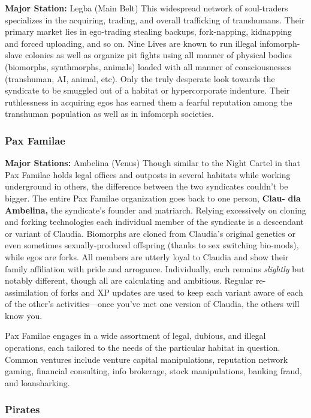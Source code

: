 \textbf{Major Station:} Legba (Main Belt)
This widespread network of soul-traders specializes 
in the acquiring, trading, and overall trafficking of 
transhumans. Their primary market lies in ego-trading
stealing backups, fork-napping, kidnapping and
forced uploading, and so on. Nine Lives are known 
to run illegal infomorph-slave colonies as well as 
organize pit fights using all manner of physical 
bodies (biomorphs, synthmorphs, animals) loaded 
with all manner of consciousnesses (transhuman, 
AI, animal, etc). Only the truly desperate look towards
the syndicate to be smuggled out of a habitat
or hypercorporate indenture. Their ruthlessness in 
acquiring egos has earned them a fearful reputation 
among the transhuman population as well as in 
infomorph societies.

\subsubsection{Pax Familae}

\textbf{Major Stations: }Ambelina (Venus)
Though similar to the Night Cartel in that Pax Familae 
holds legal offices and outposts in several habitats while 
working underground in others, the difference between 
the two syndicates couldn't be bigger. The entire Pax 
Familae organization goes back to one person, \textbf{Clau-}
\textbf{dia Ambelina,} the syndicate's founder and matriarch. 
Relying excessively on cloning and forking technologies
each individual member of the syndicate is a descendant
or variant of Claudia. Biomorphs are cloned
from Claudia's original genetics or even sometimes 
sexually-produced offspring (thanks to sex switching 
bio-mods), while egos are forks. All members are utterly
loyal to Claudia and show their family affiliation
with pride and arrogance. Individually, each remains 
\textit{slightly} but notably different, though all are calculating 
and ambitious. Regular re-assimilation of forks and XP 
updates are used to keep each variant aware of each of 
the other's activities—once you've met one version of 
Claudia, the others will know you.

Pax Familae engages in a wide assortment of legal, 
dubious, and illegal operations, each tailored to the 
needs of the particular habitat in question. Common 
ventures include venture capital manipulations, 
reputation network gaming, financial  consulting, 
info brokerage, stock manipulations, banking fraud, 
and loansharking.

\subsubsection{Pirates}

